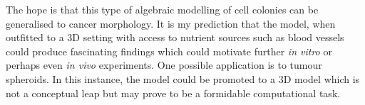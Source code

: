 The hope is that this type of algebraic modelling of cell colonies 
can be generalised to cancer morphology. It is 
my prediction that the model, when outfitted 
to a 3D setting with access to nutrient sources such as blood 
vessels could produce fascinating findings which 
could motivate further \textit{in vitro} or perhaps even 
\textit{in vivo} experiments. One possible application is 
to tumour spheroids. In this instance, 
the model could be promoted to a 3D model which 
is not a conceptual leap but may prove to be 
a formidable computational task.
